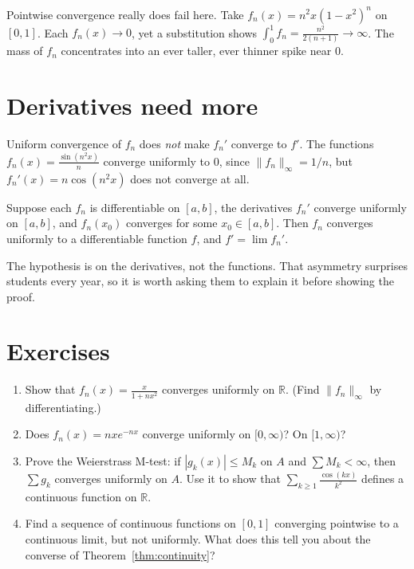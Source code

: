 Pointwise convergence really does fail here. Take $f_n(x) = n^2 x (1 - x^2)^n$ on $[0,1]$. Each $f_n(x) \to 0$, yet a substitution shows $\int_0^1 f_n = \frac{n^2}{2(n+1)} \to \infty$. The mass of $f_n$ concentrates into an ever taller, ever thinner spike near $0$.

\section{Derivatives need more}

Uniform convergence of $f_n$ does \emph{not} make $f_n'$ converge to $f'$. The functions $f_n(x) = \frac{\sin(n^2 x)}{n}$ converge uniformly to $0$, since $\|f_n\|_\infty = 1/n$, but $f_n'(x) = n \cos(n^2 x)$ does not converge at all.

\begin{theorem}[Differentiation]
Suppose each $f_n$ is differentiable on $[a,b]$, the derivatives $f_n'$ converge uniformly on $[a,b]$, and $f_n(x_0)$ converges for some $x_0 \in [a,b]$. Then $f_n$ converges uniformly to a differentiable function $f$, and $f' = \lim f_n'$.
\end{theorem}

The hypothesis is on the derivatives, not the functions. That asymmetry surprises students every year, so it is worth asking them to explain it before showing the proof.

\section{Exercises}

\begin{enumerate}
  \item Show that $f_n(x) = \frac{x}{1 + n x^2}$ converges uniformly on $\mathbb{R}$. (Find $\|f_n\|_\infty$ by differentiating.)
  \item Does $f_n(x) = n x e^{-n x}$ converge uniformly on $[0, \infty)$? On $[1, \infty)$?
  \item Prove the Weierstrass M-test: if $|g_k(x)| \le M_k$ on $A$ and $\sum M_k < \infty$, then $\sum g_k$ converges uniformly on $A$. Use it to show that $\sum_{k \ge 1} \frac{\cos(k x)}{k^2}$ defines a continuous function on $\mathbb{R}$.
  \item Find a sequence of continuous functions on $[0,1]$ converging pointwise to a continuous limit, but not uniformly. What does this tell you about the converse of Theorem~\ref{thm:continuity}?
\end{enumerate}
